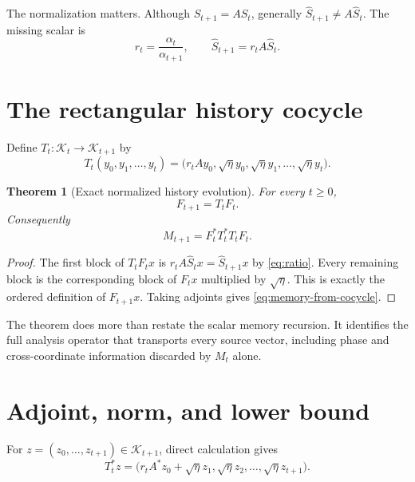 \documentclass[12pt]{article}
\newtheorem{theorem}{Theorem}[section]
\theoremstyle{definition}
\theoremstyle{remark}
\newcommand{\cK}{\mathcal K}
\begin{document}
The normalization matters.  Although $S_{t+1}=AS_t$, generally
$\widehat S_{t+1}\ne A\widehat S_t$.  The missing scalar is
\begin{equation}\label{eq:ratio}
 r_t=\frac{\alpha_t}{\alpha_{t+1}},
 \qquad
 \widehat S_{t+1}=r_tA\widehat S_t.
\end{equation}

\section{The rectangular history cocycle}

Define $T_t:\cK_t\to\cK_{t+1}$ by
\begin{equation}\label{eq:cocycle}
 T_t(y_0,y_1,\ldots,y_t)
 =\bigl(r_tAy_0,\sqrt\eta y_0,\sqrt\eta y_1,
 \ldots,\sqrt\eta y_t\bigr).
\end{equation}

\begin{theorem}[Exact normalized history evolution]\label{thm:factor-cocycle}
For every $t\ge0$,
\begin{equation}\label{eq:exact-intertwining}
 F_{t+1}=T_tF_t.
\end{equation}
Consequently
\begin{equation}\label{eq:memory-from-cocycle}
 M_{t+1}=F_t^*T_t^*T_tF_t.
\end{equation}
\end{theorem}

\begin{proof}
The first block of $T_tF_tx$ is
$r_tA\widehat S_tx=\widehat S_{t+1}x$ by
\eqref{eq:ratio}.  Every remaining block is the corresponding block of
$F_t x$ multiplied by $\sqrt\eta$.  This is exactly the ordered definition
of $F_{t+1}x$.  Taking adjoints gives \eqref{eq:memory-from-cocycle}.
\end{proof}

The theorem does more than restate the scalar memory recursion.  It identifies
the full analysis operator that transports every source vector, including
phase and cross-coordinate information discarded by $M_t$ alone.

\section{Adjoint, norm, and lower bound}

For $z=(z_0,\ldots,z_{t+1})\in\cK_{t+1}$, direct calculation gives
\begin{equation}\label{eq:adjoint}
 T_t^*z=
 \bigl(r_tA^*z_0+\sqrt\eta z_1,
 \sqrt\eta z_2,\ldots,\sqrt\eta z_{t+1}\bigr).
\end{equation}
\end{document}
